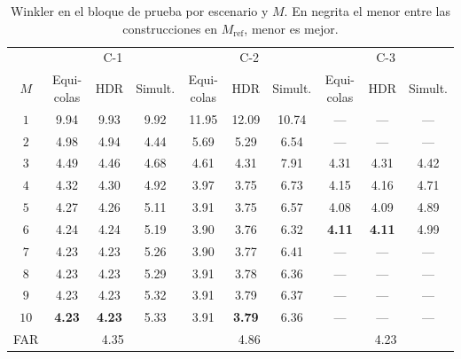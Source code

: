 \begin{table}[H]
\centering\footnotesize
\setlength{\tabcolsep}{4pt}
\caption{Winkler en el bloque de prueba por escenario y $M$. En negrita el menor entre las construcciones en $M_{\mathrm{ref}}$, menor es mejor.}
\label{tab:res_bloqueB_por_M}
\begin{tabular}{c ccc ccc ccc}
\hline
 & \multicolumn{3}{c}{C-1} & \multicolumn{3}{c}{C-2} & \multicolumn{3}{c}{C-3} \\
$M$ & Equi-colas & HDR & Simult. & Equi-colas & HDR & Simult. & Equi-colas & HDR & Simult. \\
\hline
$1$ & 9.94 & 9.93 & 9.92 & 11.95 & 12.09 & 10.74 & --- & --- & --- \\
$2$ & 4.98 & 4.94 & 4.44 & 5.69 & 5.29 & 6.54 & --- & --- & --- \\
$3$ & 4.49 & 4.46 & 4.68 & 4.61 & 4.31 & 7.91 & 4.31 & 4.31 & 4.42 \\
$4$ & 4.32 & 4.30 & 4.92 & 3.97 & 3.75 & 6.73 & 4.15 & 4.16 & 4.71 \\
$5$ & 4.27 & 4.26 & 5.11 & 3.91 & 3.75 & 6.57 & 4.08 & 4.09 & 4.89 \\
$6$ & 4.24 & 4.24 & 5.19 & 3.90 & 3.76 & 6.32 & \textbf{4.11} & \textbf{4.11} & 4.99 \\
$7$ & 4.23 & 4.23 & 5.26 & 3.90 & 3.77 & 6.41 & --- & --- & --- \\
$8$ & 4.23 & 4.23 & 5.29 & 3.91 & 3.78 & 6.36 & --- & --- & --- \\
$9$ & 4.23 & 4.23 & 5.32 & 3.91 & 3.79 & 6.37 & --- & --- & --- \\
$10$ & \textbf{4.23} & \textbf{4.23} & 5.33 & 3.91 & \textbf{3.79} & 6.36 & --- & --- & --- \\
\hline
FAR & \multicolumn{3}{c}{4.35} & \multicolumn{3}{c}{4.86} & \multicolumn{3}{c}{4.23} \\
\hline
\end{tabular}
\end{table}


